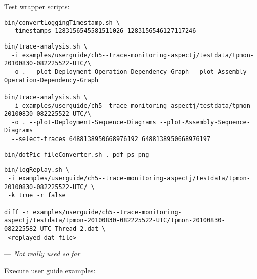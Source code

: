 \begin{compactenum}
\begin{compactenum}
\item Test wrapper scripts:
\begin{compactitem}
\item {}
\setBashListing
\begin{lstlisting}
bin/convertLoggingTimestamp.sh \
 --timestamps 1283156545581511026 1283156546127117246
\end{lstlisting}
\item {}
\setBashListing
\begin{lstlisting}
bin/trace-analysis.sh \
  -i examples/userguide/ch5--trace-monitoring-aspectj/testdata/tpmon-20100830-082225522-UTC/\
  -o . --plot-Deployment-Operation-Dependency-Graph --plot-Assembly-Operation-Dependency-Graph

bin/trace-analysis.sh \
  -i examples/userguide/ch5--trace-monitoring-aspectj/testdata/tpmon-20100830-082225522-UTC/\
  -o . --plot-Deployment-Sequence-Diagrams --plot-Assembly-Sequence-Diagrams
  --select-traces 6488138950668976192 6488138950668976197
\end{lstlisting}
\item {}
\setBashListing
\begin{lstlisting}
bin/dotPic-fileConverter.sh . pdf ps png
\end{lstlisting}
\item \file{bin/logReplay.sh}
\setBashListing
\begin{lstlisting}
bin/logReplay.sh \
 -i examples/userguide/ch5--trace-monitoring-aspectj/testdata/tpmon-20100830-082225522-UTC/ \
 -k true -r false

diff -r examples/userguide/ch5--trace-monitoring-aspectj/testdata/tpmon-20100830-082225522-UTC/tpmon-20100830-082225582-UTC-Thread-2.dat \
 <replayed dat file>
\end{lstlisting}
\item {} ---
\textit{Not really used so far}
\end{compactitem}

\item Execute user guide examples:


\end{compactenum}
\end{compactenum}
